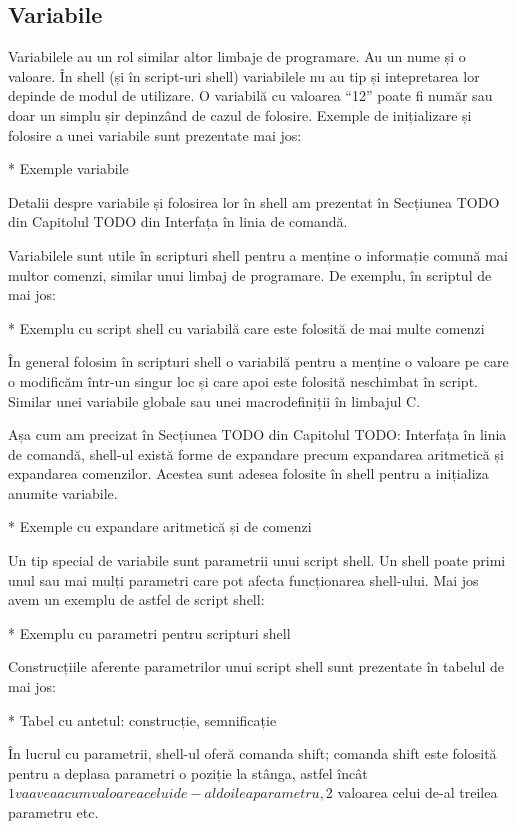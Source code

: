 \subsection{Variabile}
\label{sec:auto-func-vars}

Variabilele au un rol similar altor limbaje de programare. Au un nume și o
valoare. În shell (și în script-uri shell) variabilele nu au tip și intepretarea
lor depinde de modul de utilizare. O variabilă cu valoarea “12” poate fi număr
sau doar un simplu șir depinzând de cazul de folosire. Exemple de inițializare
și folosire a unei variabile sunt prezentate mai jos:

* Exemple variabile

Detalii despre variabile și folosirea lor în shell am prezentat în Secțiunea
TODO din Capitolul TODO din Interfața în linia de comandă.

Variabilele sunt utile în scripturi shell pentru a menține o informație comună
mai multor comenzi, similar unui limbaj de programare. De exemplu, în scriptul
de mai jos:

* Exemplu cu script shell cu variabilă care este folosită de mai multe comenzi

În general folosim în scripturi shell o variabilă pentru a menține o valoare pe
care o modificăm într-un singur loc și care apoi este folosită neschimbat în
script. Similar unei variabile globale sau unei macrodefiniții în limbajul C.

Așa cum am precizat în Secțiunea TODO din Capitolul TODO: Interfața în linia de
comandă, shell-ul există forme de expandare precum expandarea aritmetică și
expandarea comenzilor. Acestea sunt adesea folosite în shell pentru a inițializa
anumite variabile.

* Exemple cu expandare aritmetică și de comenzi

Un tip special de variabile sunt parametrii unui script shell. Un shell poate
primi unul sau mai mulți parametri care pot afecta funcționarea shell-ului. Mai
jos avem un exemplu de astfel de script shell:

* Exemplu cu parametri pentru scripturi shell

Construcțiile aferente parametrilor unui script shell sunt prezentate în tabelul
de mai jos:

* Tabel cu antetul: construcție, semnificație

În lucrul cu parametrii, shell-ul oferă comanda shift; comanda shift este
folosită pentru a deplasa parametri o poziție la stânga, astfel încât $1 va avea
acum valoarea celui de-al doilea parametru, $2 valoarea celui de-al treilea
parametru etc.

